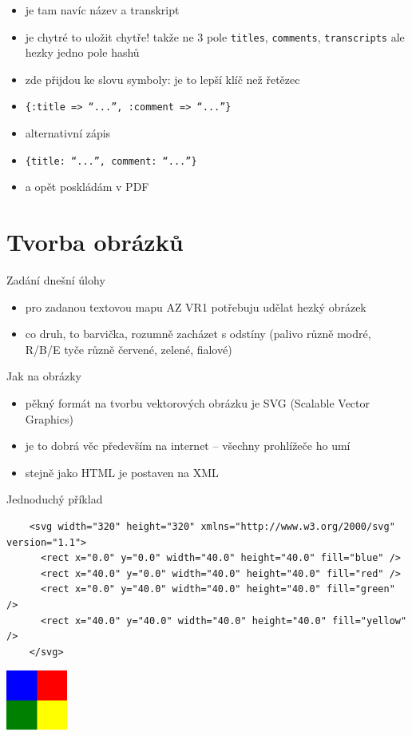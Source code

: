 \documentclass{beamer}
\begin{document}
\begin{frame}{}
  \begin{itemize}
    \item je tam navíc název a transkript
    \item je chytré to uložit chytře! takže ne 3 pole \texttt{titles}, \texttt{comments}, \texttt{transcripts} ale hezky jedno pole hashů
    \item zde přijdou ke slovu symboly: je to lepší klíč než řetězec
    \item \texttt{\{:title => ``...'', :comment => ``...''\}}
    \item  alternativní zápis
    \item \texttt{\{title: ``...'', comment: ``...''\}}
    \item a opět poskládám v PDF
  \end{itemize}
\end{frame}

\section{Tvorba obrázků}

\begin{frame}{Zadání dnešní úlohy}
  \begin{itemize}
    \item pro zadanou textovou mapu AZ VR1 potřebuju udělat hezký obrázek
    \item co druh, to barvička, rozumně zacházet s odstíny (palivo různě modré, R/B/E tyče různě červené, zelené, fialové)
  \end{itemize}
\end{frame}

\begin{frame}{Jak na obrázky}
  \begin{itemize}
    \item pěkný formát na tvorbu vektorových obrázku je SVG (Scalable Vector Graphics)
    \item je to dobrá věc především na internet -- všechny prohlížeče ho umí
    \item stejně jako HTML je postaven na XML
  \end{itemize}
\end{frame}

\begin{frame}[fragile]{Jednoduchý příklad}
  \tiny
  \begin{verbatim}
    <svg width="320" height="320" xmlns="http://www.w3.org/2000/svg" version="1.1">
      <rect x="0.0" y="0.0" width="40.0" height="40.0" fill="blue" />
      <rect x="40.0" y="0.0" width="40.0" height="40.0" fill="red" />
      <rect x="0.0" y="40.0" width="40.0" height="40.0" fill="green" />
      <rect x="40.0" y="40.0" width="40.0" height="40.0" fill="yellow" />
    </svg>
  \end{verbatim}
  \includegraphics[width=0.15\textwidth]{example}
\end{frame}
\end{document}

